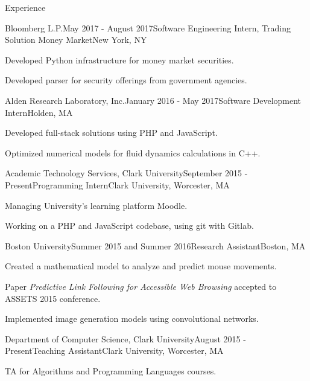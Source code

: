 \documentclass{resume} %
\begin{document}
\begin{rSection}{Experience}



\begin{rSubsection}{Bloomberg L.P.}{May 2017 - August 2017}{Software Engineering Intern, Trading Solution Money Market}{New York, NY}
\item Developed Python infrastructure for money market securities.
\item Developed parser for security offerings from government agencies.
\end{rSubsection}

\begin{rSubsection}{Alden Research Laboratory, Inc.}{January 2016 - May 2017}{Software Development Intern}{Holden, MA}
\item Developed full-stack solutions using PHP and JavaScript.
\item Optimized numerical models for fluid dynamics calculations in C++.
\end{rSubsection}


\begin{rSubsection}{Academic Technology Services, Clark University}{September 2015 - Present}{Programming Intern}{Clark University, Worcester, MA}
\item Managing University's learning platform Moodle.
\item Working on a PHP and JavaScript codebase, using git with Gitlab.
\end{rSubsection}



\begin{rSubsection}{Boston University}{Summer 2015 and Summer 2016}{Research Assistant}{Boston, MA}
\item Created a mathematical model to analyze and predict mouse movements.
\item Paper \emph{Predictive Link Following for Accessible Web Browsing} accepted to ASSETS 2015 conference.
\item Implemented image generation models using convolutional networks.
\end{rSubsection}


\begin{rSubsection}{Department of Computer Science, Clark University}{August 2015 - Present}{Teaching Assistant}{Clark University, Worcester, MA}
\item TA for Algorithms and Programming Languages courses.
\end{rSubsection}


\end{rSection}
\end{document}
